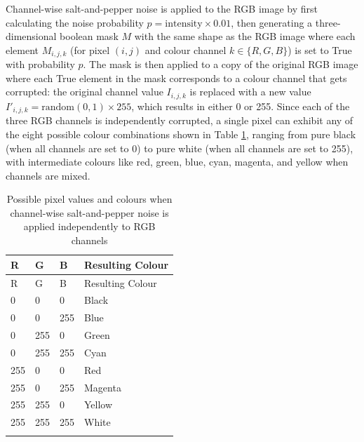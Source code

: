 Channel-wise salt-and-pepper noise is applied to the RGB image by first calculating the noise probability $p = \text{intensity} \times 0.01$, then generating a three-dimensional boolean mask $M$ with the same shape as the RGB image where each element $M_{i,j,k}$ (for pixel $(i,j)$ and colour channel $k \in \{R,G,B\}$) is set to True with probability $p$. The mask is then applied to a copy of the original RGB image where each True element in the mask corresponds to a colour channel that gets corrupted: the original channel value $I_{i,j,k}$ is replaced with a new value $I'_{i,j,k} = \text{random}(0,1) \times 255$, which results in either 0 or 255. Since each of the three RGB channels is independently corrupted, a single pixel can exhibit any of the eight possible colour combinations shown in Table \ref{tab:channel_wise_salt_pepper_colors}, ranging from pure black (when all channels are set to 0) to pure white (when all channels are set to 255), with intermediate colours like red, green, blue, cyan, magenta, and yellow when channels are mixed.



\begin{longtable}{@{}llll@{}}
\toprule
R & G & B & Resulting Colour \\
\midrule
\endfirsthead
\toprule
R & G & B & Resulting Colour \\
\midrule
\endhead
0 & 0 & 0 & Black \\
0 & 0 & 255 & Blue \\
0 & 255 & 0 & Green \\
0 & 255 & 255 & Cyan \\
255 & 0 & 0 & Red \\
255 & 0 & 255 & Magenta \\
255 & 255 & 0 & Yellow \\
255 & 255 & 255 & White \\
\bottomrule
\caption{Possible pixel values and colours when channel-wise salt-and-pepper noise is applied independently to RGB channels}
\label{tab:channel_wise_salt_pepper_colors}
\end{longtable}




